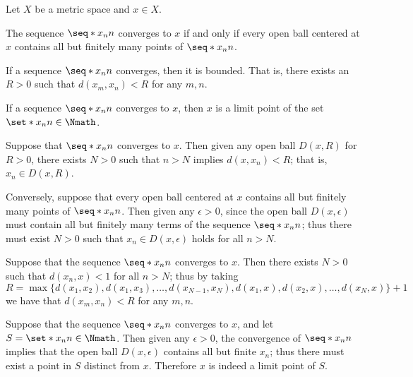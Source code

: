\begin{observation}
    \label{obv:convseq}
    Let \(X\) be a metric space and \(x\in X\).
    \begin{nlist}
        \item The sequence \(\seq*{x_n}{n}\) converges to \(x\)
        if and only if every open ball centered at \(x\)
        contains all but finitely many points of \(\seq*{x_n}{n}\).

        \item If a sequence \(\seq*{x_n}{n}\) converges,
        then it is bounded.
        That is,
        there exists an \(R>0\) such that
        \(d(x_m,x_n)<R\) for any \(m,n\).

        \item If a sequence \(\seq*{x_n}{n}\) converges to \(x\),
        then \(x\) is a limit point
        of the set \(\set*{x_n}{n\in \Nmath}\).
    \end{nlist}
\end{observation}
\begin{myproof}
    \begin{nlist}
        \item Suppose that \(\seq*{x_n}{n}\) converges to \(x\).
        Then given any open ball \(D(x,R)\) for \(R>0\),
        there exists \(N>0\) such that
        \(n>N\) implies \(d(x,x_n)<R\); that is, \(x_n\in D(x,R)\).

        Conversely, suppose that every open ball centered at \(x\)
        contains all but finitely many points of \(\seq*{x_n}{n}\).
        Then given any \(\epsilon>0\),
        since the open ball \(D(x,\epsilon)\) must contain
        all but finitely many terms of the sequence \(\seq*{x_n}{n}\);
        thus there must exist \(N>0\) such that
        \(x_n\in D(x,\epsilon)\) holds for all \(n>N\).

        \item Suppose that
        the sequence \(\seq*{x_n}{n}\) converges to \(x\).
        Then there exists \(N>0\) such that
        \(d(x_n,x)<1\) for all \(n>N\);
        thus by taking
        \[
            R
            =\max\{
                d(x_1,x_2),d(x_1,x_3),\dots,d(x_{N-1},x_N),
                d(x_1,x),d(x_2,x),\dots,d(x_N,x)
            \}+1
        \]
        we have that \(d(x_m,x_n)<R\) for any \(m,n\).

        \item Suppose that
        the sequence \(\seq*{x_n}{n}\) converges to \(x\),
        and let \(S=\set*{x_n}{n\in\Nmath}\).
        Then given any \(\epsilon>0\),
        the convergence of \(\seq*{x_n}{n}\) implies that
        the open ball \(D(x,\epsilon)\) contains all but finite \(x_n\);
        thus there must exist a point in \(S\) distinct from \(x\).
        Therefore \(x\) is indeed a limit point of \(S\).
        \rightqed
    \end{nlist}
\end{myproof}

